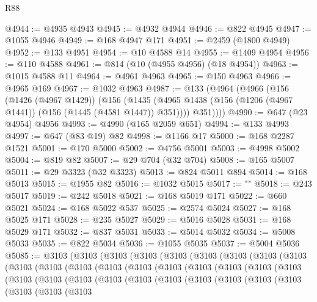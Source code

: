 \begin{lexlean}{R88}
\begin{coremodule}
@4944 := @4935 @4943
@4945 := @4932 @4944
@4946 := @822 @4945
@4947 := @1055 @4946
@4949 := @168 @4947 @171
@4951 := @2459 (@1800 @4949)
@4952 := @133 @4951
@4954 := @10 @4588 @14
@4955 := @1409 @4954
@4956 := @110 @4588
@4961 := @814 (@10 (@4955 @4956) (@18 @4954))
@4963 := @1015 @4588 @11
@4964 := @4961 @4963
@4965 := @150 @4963
@4966 := @4965 @169
@4967 := @1032 @4963
@4987 := @133
    (@4964
      (@4966
        (@156
          (@1426 (@4967 @1429))
          (@156
            (@1435 (@4965 @1438 (@156 (@1206 (@4967 @1441)) (@156 (@1445 (@4581 @1447)) @351))))
            @351))))
@4990 := @647 (@23 @4954) @4956
@4993 := @4990 (@165 @2059 @651)
@4994 := @133 @4993
@4997 := @647 (@83 @19) @82
@4998 := @1166 @17
@5000 := @168 @2287 @1521
@5001 := @170 @5000
@5002 := @4756 @5001
@5003 := @4998 @5002
@5004 := @819 @82
@5007 := @29 @704 (@32 @704)
@5008 := @165 @5007
@5011 := @29 @3323 (@32 @3323)
@5013 := @824 @5011 @894
@5014 := @168 @5013
@5015 := @1955 @82
@5016 := @1032 @5015
@5017 := "\n"
@5018 := @243 @5017
@5019 := @242 @5018
@5021 := @168 @5019 @171
@5022 := @660 @5021
@5024 := @168 @5022 @537
@5025 := @2574 @5024
@5027 := @168 @5025 @171
@5028 := @235 @5027
@5029 := @5016 @5028
@5031 := @168 @5029 @171
@5032 := @837 @5031
@5033 := @5014 @5032
@5034 := @5008 @5033
@5035 := @822 @5034
@5036 := @1055 @5035
@5037 := @5004 @5036
@5085 := @3103
    (@3103
      (@3103
        (@3103
          (@3103
            (@3103
              (@3103
                (@3103
                  (@3103
                    (@3103
                      (@3103
                        (@3103
                          (@3103
                            (@3103
                              (@3103
                                (@3103
                                  (@3103
                                    (@3103
                                      (@3103
                                        (@3103
                                          (@3103
                                            (@3103
                                              (@3103
                                                (@3103
                                                  (@3103
                                                    (@3103
                                                      (@3103
                                                        (@3103
                                                          (@3103
                                                            (@3103
                                                              (@3103
                                                                (@3103

\end{coremodule}
\end{lexlean}
